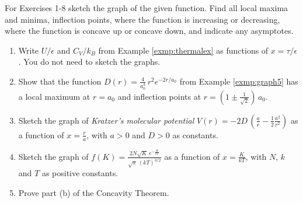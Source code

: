 \divider
\vspace{3mm}
\startexercises\label{sec4dot2}
{\small
{}
\par\noindent For Exercises 1-8 sketch the graph of the given function. Find all
local maxima and minima, inflection points, where the function is increasing or
decreasing, where the function is concave up or concave down, and indicate any
asymptotes.
\begin{enumerate}[\bfseries 1.]
  \item\label{exer:thermalex} Write $U/\epsilon$ and $C_V/k_B$ from Example
   \ref{exmp:thermalex} as functions of $x=\tau/\epsilon$. You do not need to
   sketch the graphs.
 \item Show that the function $D(r) = \frac{4}{a_0^3}\,r^2 e^{-2r/a_0}$ from Example
  \ref{exmp:graph5} has a local maximum at $r=a_0$ and inflection points at
  $r = \left(1 \pm \frac{1}{\sqrt{2}}\right)\,a_0$.
 \item Sketch the graph of \emph{Kratzer's molecular potential}
  $V(r) = -2D\,\left(\frac{a}{r} - \frac{1}{2} \frac{a^2}{r^2}\right)$ as a
  function of $x=\frac{r}{a}$, with $a > 0$ and $D > 0$ as constants.
 \item Sketch the graph of
  $f(K) = \frac{2N\sqrt{K}\,e^{-\frac{K}{kT}}}{\sqrt{\pi}\,(kT)^{3/2}}$ as a
  function of $x=\frac{K}{kT}$, with $N$, $k$ and $T$ as positive constants.
 \item Prove part (b) of the Concavity Theorem.
\end{enumerate}
}
\newpage
